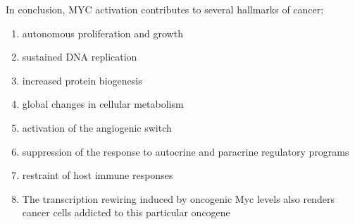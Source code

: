 In conclusion, MYC activation contributes to several hallmarks of cancer:
\begin{enumerate}
\item autonomous proliferation and growth
\item sustained DNA replication
\item increased protein biogenesis
\item global changes in cellular metabolism
\item activation of the angiogenic switch
\item suppression of the response to autocrine and paracrine regulatory programs
\item restraint of host immune responses
\item The transcription rewiring induced by oncogenic Myc levels also renders cancer cells addicted to this particular oncogene
\end{enumerate}
